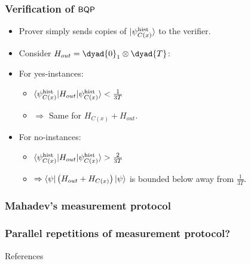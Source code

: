 \documentclass{beamer}
\begin{document}
\begin{frame}
	\frametitle{Verification of $\operatorname{\mathsf{BQP}}$}
	\begin{itemize}[<+->]
		\item Prover simply sends copies of $\ket{\psi_{C(x)}^{\mathrm{hist}}}$ to the verifier.
		\item Consider $H_{out}=\dyad{0}_1\otimes\dyad{T}$:
		\item For yes-instances:
			\begin{itemize}[<+->]
				\item $\braket{\psi_{C(x)}^{\mathrm{hist}}|H_{out}|\psi_{C(x)}^{\mathrm{hist}}}<\frac{1}{3T}$
				\item $\Rightarrow$ Same for $H_{C(x)}+H_{out}$.
			\end{itemize}
		\item For no-instances:
			\begin{itemize}[<+->]
				\item $\braket{\psi_{C(x)}^{\mathrm{hist}}|H_{out}|\psi_{C(x)}^{\mathrm{hist}}}>\frac{2}{3T}$
				\item $\Rightarrow\braket{\psi|\left(H_{out}+H_{C(x)}\right)|\psi}$ is bounded below away from $\frac{1}{3T}$.
			\end{itemize}
	\end{itemize}

\end{frame}

\begin{frame}
	\frametitle{Mahadev's measurement protocol}

\end{frame}

\begin{frame}
	\frametitle{Parallel repetitions of measurement protocol?}

\end{frame}

\begin{frame}{References}
	
	
\end{frame}
\end{document}
